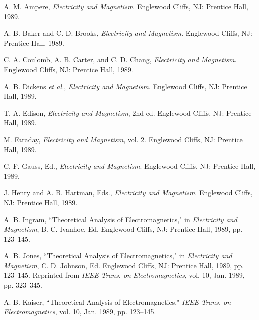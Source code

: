 \begin{thebibliography}{99}


A. M. Ampere, \emph{Electricity and Magnetism}.
Englewood Cliffs, NJ: Prentice Hall, 1989.

A. B. Baker and C. D. Brooks, \emph{Electricity and Magnetism}.
Englewood Cliffs, NJ: Prentice Hall, 1989.

C. A. Coulomb, A. B. Carter, and C. D. Chang,
\emph{Electricity and Magnetism}.
Englewood Cliffs, NJ: Prentice Hall, 1989.

A. B. Dickens \emph{et al.}, \emph{Electricity and Magnetism}.
Englewood Cliffs, NJ: Prentice Hall, 1989.

T. A. Edison, \emph{Electricity and Magnetism}, 2nd ed.
Englewood Cliffs, NJ: Prentice Hall, 1989.

M. Faraday, \emph{Electricity and Magnetism}, vol. 2.
Englewood Cliffs, NJ: Prentice Hall, 1989.

C. F. Gauss, Ed., \emph{Electricity and Magnetism}.
Englewood Cliffs, NJ: Prentice Hall, 1989.

J. Henry and A. B. Hartman, Eds., \emph{Electricity and Magnetism}.
Englewood Cliffs, NJ: Prentice Hall, 1989.

A. B. Ingram, ``Theoretical Analysis of Electromagnetics,"
in \emph{Electricity and Magnetism}, B. C. Ivanhoe, Ed.
Englewood Cliffs, NJ: Prentice Hall, 1989, pp. 123--145.

A. B. Jones, ``Theoretical Analysis of Electromagnetics,"
in \emph{Electricity and Magnetism}, C. D. Johnson, Ed.
Englewood Cliffs, NJ: Prentice Hall, 1989, pp. 123--145.
Reprinted from \emph{IEEE Trans. on Electromagnetics},
vol. 10, Jan. 1989, pp. 323--345.

A. B. Kaiser, ``Theoretical Analysis of Electromagnetics,"
\emph{IEEE Trans. on Electromagnetics}, vol. 10, Jan. 1989, pp. 123--145.


\end{thebibliography}
